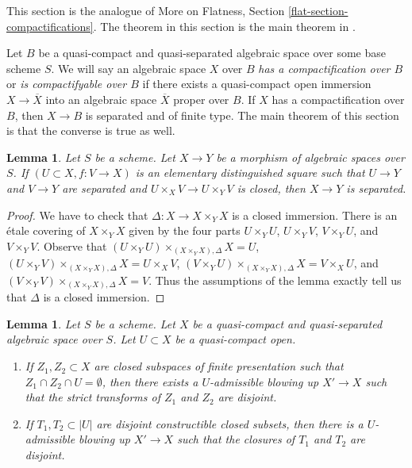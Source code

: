 \documentclass{stacks-project}
\theoremstyle{plain}
\newtheorem{lemma}[subsection]{Lemma}
\theoremstyle{definition}
\theoremstyle{remark}
\numberwithin{equation}{subsection}
\begin{document}
\noindent
This section is the analogue of More on Flatness, Section
\ref{flat-section-compactifications}. The theorem in this
section is the main theorem in \cite{CLO}.

\medskip\noindent
Let $B$ be a quasi-compact and quasi-separated algebraic space over
some base scheme $S$. We will say an algebraic space $X$ over $B$
{\it has a compactification over $B$} or {\it is compactifyable over $B$}
if there exists a quasi-compact open immersion $X \to \overline{X}$
into an algebraic space $\overline{X}$ proper over $B$. If $X$
has a compactification over $B$, then $X \to B$ is separated and
of finite type. The main theorem of this section is that the converse
is true as well.

\begin{lemma}
\label{lemma-check-separated}
Let $S$ be a scheme. Let $X \to Y$ be a morphism of algebraic spaces over $S$.
If $(U \subset X, f : V \to X)$ is an elementary distinguished square
such that $U \to Y$ and $V \to Y$ are separated and
$U \times_X V \to U \times_Y V$ is closed, then $X \to Y$ is separated.
\end{lemma}

\begin{proof}
We have to check that $\Delta : X \to X \times_Y X$ is a closed immersion.
There is an \'etale covering of $X \times_Y X$ given by the four parts
$U \times_Y U$, $U \times_Y V$, $V \times_Y U$, and $V \times_Y V$.
Observe that
$(U \times_Y U) \times_{(X \times_Y X), \Delta} X  = U$,
$(U \times_Y V) \times_{(X \times_Y X), \Delta} X = U \times_X V$,
$(V \times_Y U) \times_{(X \times_Y X), \Delta} X = V \times_X U$, and
$(V \times_Y V) \times_{(X \times_Y X), \Delta} X = V$.
Thus the assumptions of the lemma
exactly tell us that $\Delta$ is a closed immersion.
\end{proof}

\begin{lemma}
\label{lemma-separate-disjoint-locally-closed-by-blowing-up}
Let $S$ be a scheme.
Let $X$ be a quasi-compact and quasi-separated algebraic space over $S$.
Let $U \subset X$ be a quasi-compact open.
\begin{enumerate}
\item If $Z_1, Z_2 \subset X$ are closed subspaces of finite
presentation such that $Z_1 \cap Z_2 \cap U = \emptyset$, then
there exists a $U$-admissible blowing up $X' \to X$
such that the strict transforms of $Z_1$ and $Z_2$ are disjoint.
\item If $T_1, T_2 \subset |U|$ are disjoint constructible closed
subsets, then there is a $U$-admissible blowing up $X' \to X$
such that the closures of $T_1$ and $T_2$ are disjoint.
\end{enumerate}
\end{lemma}
\end{document}
